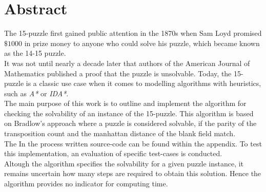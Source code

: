 \chapter*{Abstract}

The 15-puzzle first gained public attention in the 1870s when Sam Loyd promised $\$1000$ in prize money to anyone who could solve his puzzle, which became known as the 14-15 puzzle.\\
It was not until nearly a decade later that authors of the American Journal of Mathematics published a proof that the puzzle is unsolvable.
Today, the 15-puzzle is a classic use case when it comes to modelling algorithms with heuristics, such as \textit{A*} or \textit{IDA*}.\\
The main purpose of this work is to outline and implement the algorithm for checking the solvability of an instance of the 15-puzzle.
This algorithm is based on Bradlow's approach where a puzzle is considered solvable, if the parity of the transposition count and the manhattan distance of the blank field match.\\The In the process written source-code can be found within the appendix. To test this implementation, an evaluation of specific test-cases is conducted.\\
Altough the algorithm specifies the solvability for a given puzzle instance, it remains uncertain how many steps are required to obtain this solution. Hence the algorithm provides no indicator for computing time.
